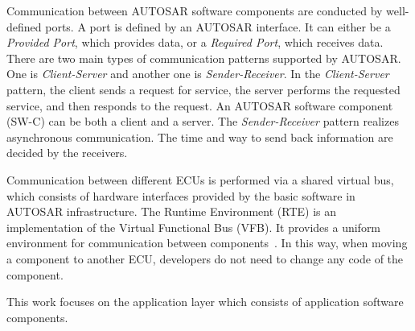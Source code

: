 Communication between AUTOSAR software components are conducted by well-defined ports. A port is  defined by an AUTOSAR interface. It can either be a {\em Provided Port}, which provides data, or a {\em Required Port}, which receives data. There are two main types of communication patterns supported by AUTOSAR. One is {\em Client-Server} and another one is {\em Sender-Receiver}. In the {\em Client-Server} pattern, the client sends a request for service, the server performs the requested service, %
and then responds to the request. An AUTOSAR software component (SW-C) can be both a client and a server. The {\em Sender-Receiver} pattern realizes asynchronous communication. %
The time and way to send back information are decided by the receivers.

Communication between different ECUs is performed via a shared virtual bus, which consists of hardware interfaces provided by the basic software in AUTOSAR infrastructure. The Runtime Environment (RTE) is an implementation of the Virtual Functional Bus (VFB). It provides a uniform environment for communication between components~\cite{aa}. In this way, when moving a component to another ECU, developers do not need to change any code of the component. %



This work focuses on the application layer which consists of application software components. %


